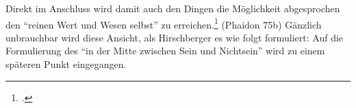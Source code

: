 Direkt im Anschluss wird damit auch den Dingen die Möglichkeit abgesprochen den \enquote{reinen Wert und Wesen selbst} zu erreichen.\footcite[vgl.][S. 100]{Hirschberger} (Phaidon 75b)
Gänzlich unbrauchbar wird diese Ansicht, als Hirschberger es wie folgt formuliert:
Auf die Formulierung des \enquote{in der Mitte zwischen Sein und Nichtsein} wird zu einem späteren Punkt eingegangen.




